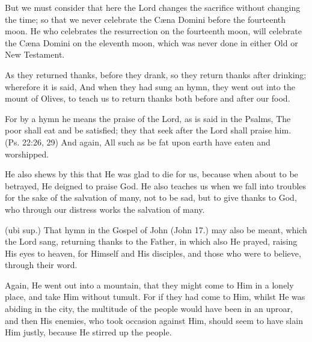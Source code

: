  But we must consider that here the Lord changes the sacrifice without changing the time; so that we never celebrate the Cæna Domini before the fourteenth moon. He who celebrates the resurrection on the fourteenth moon, will celebrate the Cæna Domini on the eleventh moon, which was never done in either Old or New Testament.

 

 As they returned thanks, before they drank, so they return thanks after drinking; wherefore it is said, And when they had sung an hymn, they went out into the mount of Olives, to teach us to return thanks both before and after our food.

 For by a hymn he means the praise of the Lord, as is said in the Psalms, The poor shall eat and be satisfied; they that seek after the Lord shall praise him. (Ps. 22:26, 29) And again, All such as be fat upon earth have eaten and worshipped.

 He also shews by this that He was glad to die for us, because when about to be betrayed, He deigned to praise God. He also teaches us when we fall into troubles for the sake of the salvation of many, not to be sad, but to give thanks to God, who through our distress works the salvation of many.

 (ubi sup.) That hymn in the Gospel of John (John 17.) may also be meant, which the Lord sang, returning thanks to the Father, in which also He prayed, raising His eyes to heaven, for Himself and His disciples, and those who were to believe, through their word.

 Again, He went out into a mountain, that they might come to Him in a lonely place, and take Him without tumult. For if they had come to Him, whilst He was abiding in the city, the multitude of the people would have been in an uproar, and then His enemies, who took occasion against Him, should seem to have slain Him justly, because He stirred up the people.

